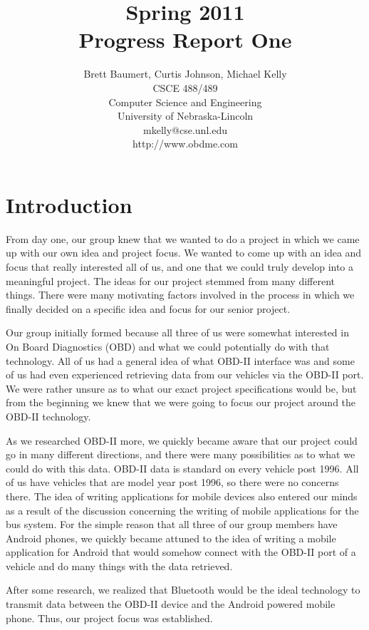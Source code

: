 \documentclass[12pt]{article}
\title{\bf Spring 2011 \\
Progress Report One}
\author{Brett Baumert, Curtis Johnson, Michael Kelly \\
CSCE 488/489 \\
Computer Science and Engineering\\
University of Nebraska-Lincoln\\
mkelly@cse.unl.edu \\
http://www.obdme.com \\
}
\newcommand{\doublespace}{\baselineskip0.34truein}
\begin{document}
\maketitle


\section{Introduction}\label{sec:Introduction}

From day one, our group knew that we wanted to do a project in which we came up with our own idea and project focus. We wanted to come up with an idea and focus that really interested all of us, and one that we could truly develop into a meaningful project.  The ideas for our project stemmed from many different things. There were many motivating factors involved in the process in which we finally decided on a specific idea and focus for our senior project.

Our group initially formed because all three of us were somewhat interested in On Board Diagnostics (OBD) and what we could potentially do with that technology. All of us had a general idea of what OBD-II interface was and some of us had even experienced retrieving data from our vehicles via the OBD-II port. We were rather unsure as to what our exact project specifications would be, but from the beginning we knew that we were going to focus our project around the OBD-II technology.

As we researched OBD-II more, we quickly became aware that our project could go in many different directions, and there were many possibilities as to what we could do with this data. OBD-II data is standard on every vehicle post 1996. All of us have vehicles that are model year post 1996, so there were no concerns there. The idea of writing applications for mobile devices also entered our minds as a result of the discussion concerning the writing of mobile applications for the bus system. For the simple reason that all three of our group members have Android phones, we quickly became attuned to the idea of writing a mobile application for Android that would somehow connect with the OBD-II port of a vehicle and do many things with the data retrieved.

After some research, we realized that Bluetooth would be the ideal technology to transmit data between the OBD-II device and the Android powered mobile phone. Thus, our project focus was established.
\end{document}
